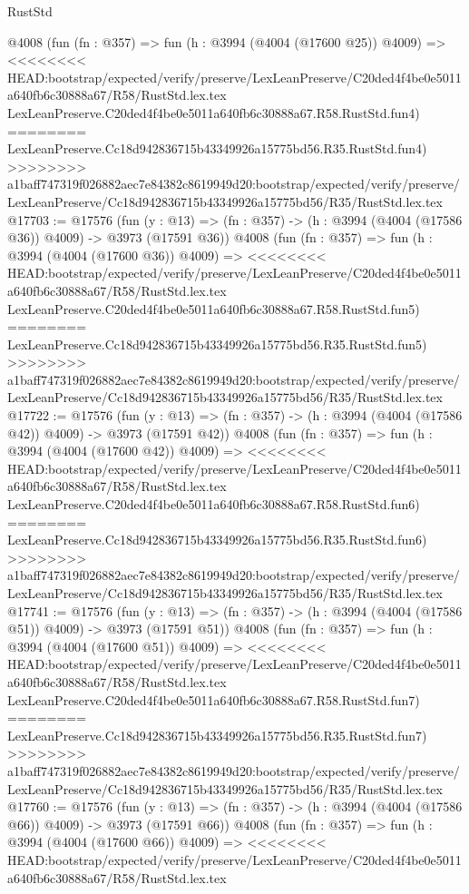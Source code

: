 \begin{lexlean}{RustStd}
\begin{coremodule}
{\begin{coremodule}
{{{{{{{{{{{{{{{{    @4008
    (fun (fn : @357) =>
    fun (h : @3994 (@4004 (@17600 @25)) @4009) =>
<<<<<<<< HEAD:bootstrap/expected/verify/preserve/LexLeanPreserve/C20ded4f4be0e5011a640fb6c30888a67/R58/RustStd.lex.tex
    LexLeanPreserve.C20ded4f4be0e5011a640fb6c30888a67.R58.RustStd.fun4)
========
    LexLeanPreserve.Cc18d942836715b43349926a15775bd56.R35.RustStd.fun4)
>>>>>>>> a1baff747319f026882aec7e84382c8619949d20:bootstrap/expected/verify/preserve/LexLeanPreserve/Cc18d942836715b43349926a15775bd56/R35/RustStd.lex.tex
@17703 := @17576
    (fun (y : @13) => (fn : @357) -> (h : @3994 (@4004 (@17586 @36)) @4009) -> @3973 (@17591 @36))
    @4008
    (fun (fn : @357) =>
    fun (h : @3994 (@4004 (@17600 @36)) @4009) =>
<<<<<<<< HEAD:bootstrap/expected/verify/preserve/LexLeanPreserve/C20ded4f4be0e5011a640fb6c30888a67/R58/RustStd.lex.tex
    LexLeanPreserve.C20ded4f4be0e5011a640fb6c30888a67.R58.RustStd.fun5)
========
    LexLeanPreserve.Cc18d942836715b43349926a15775bd56.R35.RustStd.fun5)
>>>>>>>> a1baff747319f026882aec7e84382c8619949d20:bootstrap/expected/verify/preserve/LexLeanPreserve/Cc18d942836715b43349926a15775bd56/R35/RustStd.lex.tex
@17722 := @17576
    (fun (y : @13) => (fn : @357) -> (h : @3994 (@4004 (@17586 @42)) @4009) -> @3973 (@17591 @42))
    @4008
    (fun (fn : @357) =>
    fun (h : @3994 (@4004 (@17600 @42)) @4009) =>
<<<<<<<< HEAD:bootstrap/expected/verify/preserve/LexLeanPreserve/C20ded4f4be0e5011a640fb6c30888a67/R58/RustStd.lex.tex
    LexLeanPreserve.C20ded4f4be0e5011a640fb6c30888a67.R58.RustStd.fun6)
========
    LexLeanPreserve.Cc18d942836715b43349926a15775bd56.R35.RustStd.fun6)
>>>>>>>> a1baff747319f026882aec7e84382c8619949d20:bootstrap/expected/verify/preserve/LexLeanPreserve/Cc18d942836715b43349926a15775bd56/R35/RustStd.lex.tex
@17741 := @17576
    (fun (y : @13) => (fn : @357) -> (h : @3994 (@4004 (@17586 @51)) @4009) -> @3973 (@17591 @51))
    @4008
    (fun (fn : @357) =>
    fun (h : @3994 (@4004 (@17600 @51)) @4009) =>
<<<<<<<< HEAD:bootstrap/expected/verify/preserve/LexLeanPreserve/C20ded4f4be0e5011a640fb6c30888a67/R58/RustStd.lex.tex
    LexLeanPreserve.C20ded4f4be0e5011a640fb6c30888a67.R58.RustStd.fun7)
========
    LexLeanPreserve.Cc18d942836715b43349926a15775bd56.R35.RustStd.fun7)
>>>>>>>> a1baff747319f026882aec7e84382c8619949d20:bootstrap/expected/verify/preserve/LexLeanPreserve/Cc18d942836715b43349926a15775bd56/R35/RustStd.lex.tex
@17760 := @17576
    (fun (y : @13) => (fn : @357) -> (h : @3994 (@4004 (@17586 @66)) @4009) -> @3973 (@17591 @66))
    @4008
    (fun (fn : @357) =>
    fun (h : @3994 (@4004 (@17600 @66)) @4009) =>
<<<<<<<< HEAD:bootstrap/expected/verify/preserve/LexLeanPreserve/C20ded4f4be0e5011a640fb6c30888a67/R58/RustStd.lex.tex
}}}}}}}}}}}}}}}}
\end{coremodule}}
\end{coremodule}
\end{lexlean}
